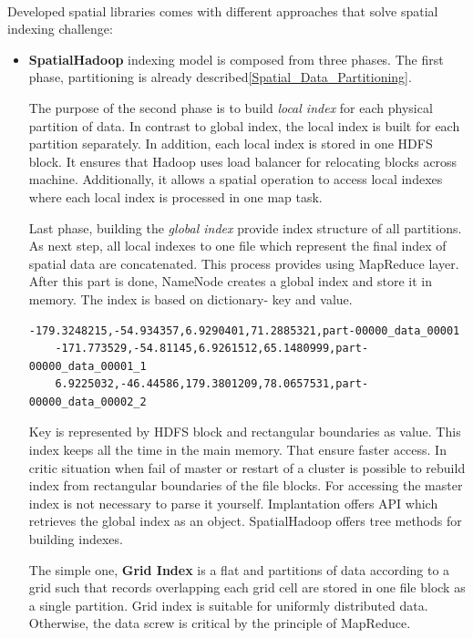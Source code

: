 \documentclass[a4paper,12pt,oneside]{report}
\begin{document}
\paragraph{} Developed spatial libraries comes with different approaches that solve  spatial indexing challenge:
\begin{itemize}
\item \textbf{SpatialHadoop} indexing model is composed from three phases. The first phase, partitioning is already
described\ref{Spatial_Data_Partitioning}.

The purpose of the second phase is to build \textit{local index}  for each physical partition of data. 
In contrast to global index, the local index is built for each partition separately. In addition, each local 
index is stored in one HDFS block. It ensures that Hadoop uses load balancer for relocating blocks 
across machine. Additionally, it allows  a spatial operation to access local indexes where each local 
index is processed in one map task. 

Last phase, building the \textit{global index} provide index structure of all partitions. As next step, 
all local indexes to one file which represent the final index of spatial data are concatenated. This process 
provides using MapReduce  layer. After this part is done, NameNode creates a global index
and store it in memory. The index is based on dictionary- key and value.

\begin{footnotesize}
	\begin{lstlisting}[style=mybash]
	-179.3248215,-54.934357,6.9290401,71.2885321,part-00000_data_00001
	-171.773529,-54.81145,6.9261512,65.1480999,part-00000_data_00001_1
	6.9225032,-46.44586,179.3801209,78.0657531,part-00000_data_00002_2
	\end{lstlisting}\end{footnotesize}


Key is represented by HDFS block and  rectangular boundaries as value. This index keeps all the 
time in the main memory. That ensure faster access. In critic situation when fail of master or 
restart of a cluster is possible to rebuild index from rectangular boundaries of the file blocks. 
For accessing the master index is not necessary to parse it yourself. Implantation offers API 
which retrieves the global index as an object.
SpatialHadoop offers tree methods for building indexes. 

The simple one, \textbf{Grid Index} is a flat and partitions of
data according to a grid such that records overlapping each grid cell are stored in one file block 
as a single partition. Grid index is suitable for uniformly distributed data. Otherwise, the data 
screw is critical by the principle of MapReduce. 


\end{itemize}
\end{document}
